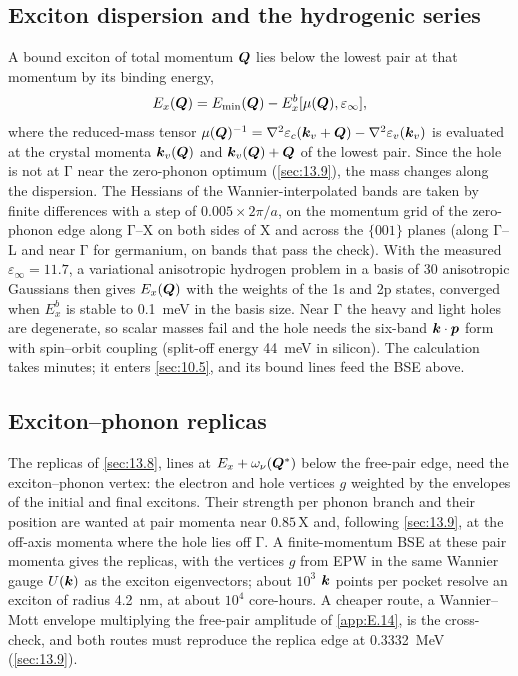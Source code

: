 \subsection{Exciton dispersion and the hydrogenic series}

A bound exciton of total momentum $\bm{Q}$ lies below the lowest pair at that momentum by its binding energy,
\begin{equation}
  E_x(\bm{Q}) = E_{\mathrm{min}}(\bm{Q}) - E_x^b[\mu(\bm{Q}),\varepsilon_\infty] ,
  \label{eq:E.15-disp}
\end{equation}
where the reduced-mass tensor $\mu(\bm{Q})^{-1} = \nabla^2\varepsilon_c(\bm{k}_v+\bm{Q}) - \nabla^2\varepsilon_v(\bm{k}_v)$ is evaluated at the crystal momenta $\bm{k}_v(\bm{Q})$ and $\bm{k}_v(\bm{Q})+\bm{Q}$ of the lowest pair. Since the hole is not at $\mathrm{\Gamma}$ near the zero-phonon optimum (\cref{sec:13.9}), the mass changes along the dispersion. The Hessians of the Wannier-interpolated bands are taken by finite differences with a step of $0.005\times2\pi/a$, on the momentum grid of the zero-phonon edge along $\mathrm{\Gamma}$--X on both sides of X and across the $\{001\}$ planes (along $\mathrm{\Gamma}$--L and near $\mathrm{\Gamma}$ for germanium, on bands that pass the check). With the measured $\varepsilon_\infty = 11.7$, a variational anisotropic hydrogen problem in a basis of 30 anisotropic Gaussians then gives $E_x(\bm{Q})$ with the weights of the 1s and 2p states, converged when $E_x^b$ is stable to \SI{0.1}{meV} in the basis size. Near $\mathrm{\Gamma}$ the heavy and light holes are degenerate, so scalar masses fail and the hole needs the six-band $\bm{k}\cdot\bm{p}$ form with spin--orbit coupling (split-off energy \SI{44}{meV} in silicon). The calculation takes minutes; it enters \cref{sec:10.5}, and its bound lines feed the BSE above.

\subsection{Exciton--phonon replicas}

The replicas of \cref{sec:13.8}, lines at $E_x + \omega_\nu(\bm{Q}^*)$ below the free-pair edge, need the exciton--phonon vertex: the electron and hole vertices $g$ weighted by the envelopes of the initial and final excitons. Their strength per phonon branch and their position are wanted at pair momenta near $0.85\,\mathrm{X}$ and, following \cref{sec:13.9}, at the off-axis momenta where the hole lies off $\mathrm{\Gamma}$. A finite-momentum BSE at these pair momenta gives the replicas, with the vertices $g$ from EPW in the same Wannier gauge $U(\bm{k})$ as the exciton eigenvectors; about $10^3$ $\bm{k}$ points per pocket resolve an exciton of radius \SI{4.2}{nm}, at about $10^4$ core-hours. A cheaper route, a Wannier--Mott envelope multiplying the free-pair amplitude of \cref{app:E.14}, is the cross-check, and both routes must reproduce the replica edge at \SI{0.3332}{MeV} (\cref{sec:13.9}).

